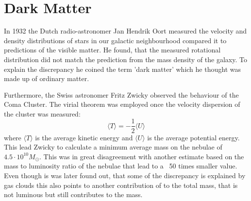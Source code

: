 \chapter{Dark Matter}
\label{ch:DM}
In 1932 the Dutch radio-astronomer Jan Hendrik Oort measured the velocity and density distributions of stars in our galactic neighbourhood compared it to predictions of the visible matter. He found, that the measured rotational distribution did not match the prediction from the mass density of the galaxy. To explain the discrepancy he coined the term 'dark matter' which he thought was made up of ordinary matter. 

Furthermore, the Swiss astronomer Fritz Zwicky observed the behaviour of the Coma Cluster. The virial theorem was employed once the velocity dispersion of the cluster was measured:
\begin{equation}
\langle T \rangle = -\frac{1}{2}\langle U \rangle
\end{equation}
where $\langle T \rangle$ is the average kinetic energy and $\langle U \rangle$ is the average potential energy. This lead Zwicky to calculate a minimum average mass on the nebulae of $4.5\cdot 10^{10} M_\odot$. This was in great disagreement with another estimate based on the mass to luminosity ratio of the nebulae that lead to a ~50 times smaller value. Even though is was later found out, that some of the discrepancy is explained by gas clouds this also points to another contribution of to the total mass, that is not luminous but still contributes to the mass.

